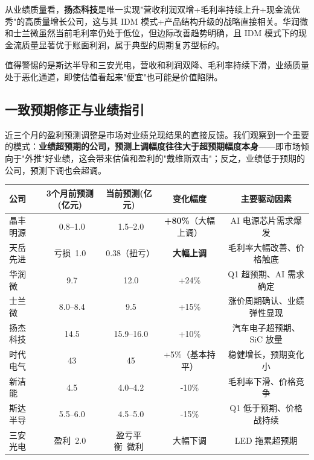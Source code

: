 从业绩质量看，\textbf{扬杰科技}是唯一实现"营收利润双增+毛利率持续上升+现金流优秀"的高质量增长公司，这与其 IDM 模式+产品结构升级的战略直接相关。华润微和士兰微虽然当前毛利率仍处于低位，但边际改善趋势明确，且 IDM 模式下的现金流质量显著优于账面利润，属于典型的周期复苏型标的。

值得警惕的是斯达半导和三安光电，营收和利润双降、毛利率持续下滑，业绩质量处于恶化通道，即使估值看起来"便宜"也可能是价值陷阱。

\subsection{一致预期修正与业绩指引}

近三个月的盈利预测调整是市场对业绩兑现结果的直接反馈。我们观察到一个重要的模式：\textbf{业绩超预期的公司，预测上调幅度往往大于超预期幅度本身}——即市场倾向于"外推"好业绩，这会带来估值和盈利的"戴维斯双击"；反之，业绩低于预期的公司，预测下调也会超调。

\begin{exhibitbox}[表 7-8：近 3 个月 2026E 盈利预测调整汇总]
\centering
\small
\begin{tabularx}{\textwidth}{X c c c c}
\toprule
\textbf{公司} & \textbf{3个月前预测(亿元)} & \textbf{当前预测(亿元)} & \textbf{变化幅度} & \textbf{主要驱动因素} \\
\midrule
\rowcolor{riskgreen!10}
晶丰明源 & ~0.8–1.0 & ~1.5–2.0 & \textbf{+80\%}（大幅上调） & AI 电源芯片需求爆发 \\
\rowcolor{riskgreen!10}
天岳先进 & 亏损~1.0 & 0.38（扭亏） & \textbf{大幅上调} & 毛利率大幅改善、价格触底 \\
\rowcolor{riskgreen!10}
华润微 & ~9.7 & ~12.0 & +24\% & Q1 超预期、AI 需求确定 \\
\rowcolor{riskgreen!10}
士兰微 & ~8.0–8.4 & ~9.5 & +15\% & 涨价周期确认、业绩弹性显现 \\
\rowcolor{riskgreen!10}
扬杰科技 & ~14.5 & ~15.9–16.0 & +10\% & 汽车电子超预期、SiC 放量 \\
\rowcolor{riskamber!10}
时代电气 & ~43 & ~45 & +5\%（基本持平） & 稳健增长，预期变化小 \\
\rowcolor{riskred!10}
新洁能 & ~4.5 & ~4.0–4.2 & -10\% & 毛利率下滑、价格竞争 \\
\rowcolor{riskred!10}
斯达半导 & ~5.5–6.0 & ~4.5–5.0 & -15\% & Q1 低于预期、价格战持续 \\
\rowcolor{riskred!10}
三安光电 & 盈利~2.0 & 盈亏平衡~微利 & 大幅下调 & LED 拖累超预期 \\
\bottomrule
\end{tabularx}
\end{exhibitbox}


